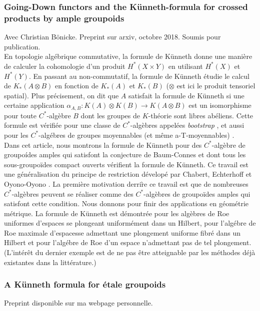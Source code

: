 \documentclass[a4paper,11pt]{article}
\begin{document}
\subsubsection*{Going-Down functors and the Künneth-formula for crossed products by ample groupoids} Avec Christian Bönicke. Preprint sur arxiv, octobre 2018. Soumis pour publication.\\

En topologie alg\'ebrique commutative, la formule de K\"unneth donne une mani\`ere de calculer la cohomologie d'un produit $H^*(X\times Y)$ en utilisant $H^*(X)$ et $H^*(Y)$. En passant au non-commutatif, la formule de K\"unneth \'etudie le calcul de $K_*(A \otimes B)$ en fonction de $K_*(A)$ et $K_*(B)$ ($\otimes$ est ici le produit tensoriel spatial). Plus pr\'ecisement, on dit que $A$ satisfait la formule de K\"unneth si une certaine application $\alpha_{A,B}: K(A)\otimes K(B) \rightarrow K(A\otimes B)$ est un isomorphisme pour toute $C^*$-alg\`ebre $B$ dont les groupes de $K$-th\'eorie sont libres ab\'eliens. Cette formule est v\'erifi\'ee pour une classe de $C^*$-alg\`ebres appel\'ees \textit{bootstrap} \cite{rosenberg1987kunneth}, et aussi pour les $C^*$-alg\'ebres de groupes moyennables (et m\^eme a-T-moyennables) \cite{BaumConnesHigson}\cite{TuThese}. \\

Dans cet article, nous montrons la formule de K\"unneth pour des $C^*$-alg\`ebre de groupo\'ides amples qui satisfont la conjecture de Baum-Connes et dont tous les sous-groupo\"ides compact ouverts v\'erifient la formule de K\"unneth. Ce travail est une g\'en\'eralisation du principe de restriction d\'evelop\'e par Chabert, Echterhoff et Oyono-Oyono \cite{ChabertEOY}. La premi\`ere motivation derri\`re ce travail est que de nombreuses $C^*$-alg\`ebres peuvent se r\'ealiser comme des $C^*$-alg\`ebres de groupo\"ides amples qui satisfont cette condition. Nous donnons pour finir des applications en g\'eom\'etrie m\'etrique. La formule de K\"unneth est d\'emontr\'ee pour les alg\`ebres de Roe uniformes d'espaces se plongeant uniform\'ement dans un Hilbert, pour l'alg\'ebre de Roe maximale d'espacesse admettant une plongement uniforme fibr\'e dans un Hilbert et pour l'alg\'ebre de Roe d'un espace n'admettant pas de tel plongement. (L'int\'er\^et du dernier exemple est de ne pas \^etre atteignable par les m\'ethodes d\'ej\`a existantes dans la litt\'erature.)  

\subsubsection*{A K\"{u}nneth formula for \'etale groupoids} Preprint disponible sur ma webpage personnelle.\\
\end{document}
